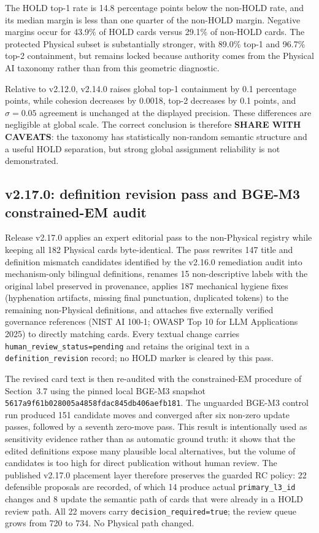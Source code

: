 \documentclass[11pt,a4paper]{article}
\newcommand{\code}[1]{\texttt{#1}}
\begin{document}
The HOLD top-1 rate is 14.8 percentage points below the non-HOLD rate, and its
median margin is less than one quarter of the non-HOLD margin. Negative margins
occur for 43.9\% of HOLD cards versus 29.1\% of non-HOLD cards. The protected
Physical subset is substantially stronger, with 89.0\% top-1 and 96.7\% top-2
containment, but remains locked because authority comes from the Physical AI
taxonomy rather than from this geometric diagnostic.

Relative to v2.12.0, v2.14.0 raises global top-1 containment by 0.1 percentage
points, while cohesion decreases by 0.0018, top-2 decreases by 0.1 points, and
$\sigma=0.05$ agreement is unchanged at the displayed precision. These
differences are negligible at global scale. The correct conclusion is therefore
\textbf{SHARE WITH CAVEATS}: the taxonomy has statistically non-random semantic
structure and a useful HOLD separation, but strong global assignment
reliability is not demonstrated.



\subsection{v2.17.0: definition revision pass and BGE-M3 constrained-EM audit}

Release v2.17.0 applies an expert editorial pass to the non-Physical registry
while keeping all 182 Physical cards byte-identical. The pass rewrites 147
title and definition mismatch candidates identified by the v2.16.0 remediation
audit into mechanism-only bilingual definitions, renames 15 non-descriptive
labels with the original label preserved in provenance, applies 187 mechanical
hygiene fixes (hyphenation artifacts, missing final punctuation, duplicated
tokens) to the remaining non-Physical definitions, and attaches five
externally verified governance references (NIST AI 100-1; OWASP Top 10 for LLM
Applications 2025) to directly matching cards. Every textual change carries
\code{human\_review\_status=pending} and retains the original text in a
\code{definition\_revision} record; no HOLD marker is cleared by this pass.

The revised card text is then re-audited with the constrained-EM procedure of
Section~3.7 using the pinned local BGE-M3 snapshot
\code{5617a9f61b028005a4858fdac845db406aefb181}. The unguarded BGE-M3 control
run produced 151 candidate moves and converged after six non-zero update
passes, followed by a seventh zero-move pass. This result is intentionally
used as sensitivity evidence rather than as automatic ground truth: it shows
that the edited definitions expose many plausible local alternatives, but the
volume of candidates is too high for direct publication without human review.
The published v2.17.0 placement layer therefore preserves the guarded RC
policy: 22 defensible proposals are recorded, of which 14 produce actual
\code{primary\_l3\_id} changes and 8 update the semantic path of cards that
were already in a HOLD review path. All 22 movers carry
\code{decision\_required=true}; the review queue grows from 720 to 734. No
Physical path changed.
\end{document}
